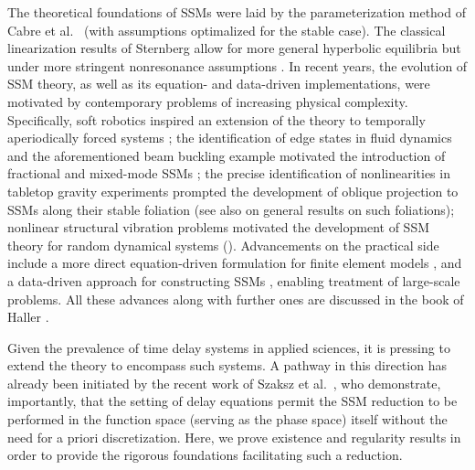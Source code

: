 \documentclass[a4paper, 12pt, oneside, reqno, notitlepage]{amsart}
\theoremstyle{plain}
\theoremstyle{definition}
\theoremstyle{remark}
\begin{document}
The theoretical foundations of SSMs were laid by the parameterization method of Cabre et al.~\cite{Cabre2003a,cabre2003parameterization2,cabre2005parameterization3,haro2006parameterization,haro2006parameterizationb} (with assumptions optimalized for the stable case).
The classical linearization results of Sternberg \cite{sternberg1957local,sternberg1958structure} allow for more general hyperbolic equilibria but under more stringent nonresonance assumptions \cite{haller2025modeling}. 
In recent years, the evolution of SSM theory, as well as its equation- and data-driven implementations, were motivated by contemporary problems of increasing physical complexity.
Specifically, soft robotics inspired an extension of the theory to temporally aperiodically forced systems \cite{haller2024nonlinear,kaundinya2025data}; 
the identification of edge states in fluid dynamics \cite{kaszas2022dynamics} and the aforementioned beam buckling example motivated the introduction of fractional and mixed-mode SSMs \cite{haller2023nonlinear};
the precise identification of nonlinearities in
tabletop
gravity experiments prompted the development of oblique projection to SSMs along their stable foliation \cite{bettini2025data}  (see also \cite{szalai2020invariant} on general results on such foliations);
nonlinear structural vibration problems motivated the development of SSM theory for random dynamical systems (\cite{xu2025nonlinear}).
Advancements on the practical side include a more direct equation-driven formulation for finite element models \cite{jain2022compute,vizzaccaro2022high,opreni2023high},  and a data-driven approach for constructing SSMs \cite{cenedese2022data,axaas2023fast}, enabling treatment of large-scale problems. 
All these advances along with further ones are discussed in the book of Haller \cite{haller2025modeling}.

Given the prevalence of time delay systems in applied sciences, it is pressing to extend the theory to encompass such systems.
A pathway in this direction has already been initiated by the recent work of Szaksz et al.~\cite{szaksz2024reduction,szaksz2025spectral}, who 
demonstrate, importantly, that the setting of delay equations permit the SSM reduction to be performed in the function space (serving as the phase space) itself 
without the need for a priori discretization. 
Here, we prove existence and regularity results in order to provide the rigorous foundations facilitating such a reduction.
\end{document}
